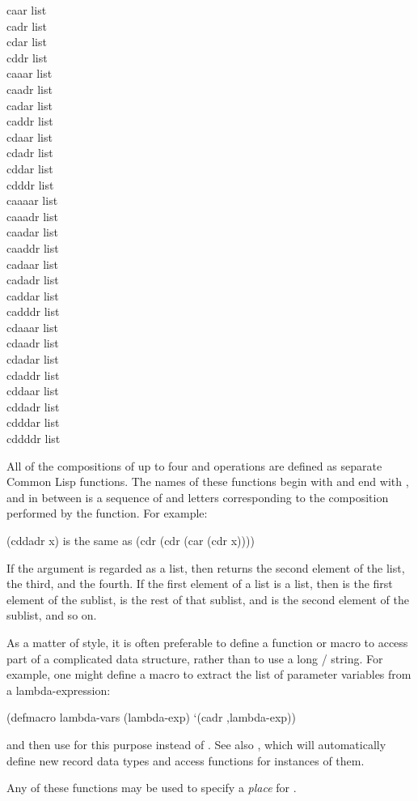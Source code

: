 \begin{defun}[Function]
caar list \\
cadr list \\
cdar list \\
cddr list \\
caaar list \\
caadr list \\
cadar list \\
caddr list \\
cdaar list \\
cdadr list \\
cddar list \\
cdddr list \\
caaaar list \\
caaadr list \\
caadar list \\
caaddr list \\
cadaar list \\
cadadr list \\
caddar list \\
cadddr list \\
cdaaar list \\
cdaadr list \\
cdadar list \\
cdaddr list \\
cddaar list \\
cddadr list \\
cdddar list \\
cddddr list

All of the compositions of up to four  and  operations
are defined as separate Common Lisp functions.
The names of these functions begin with  and end with ,
and in between is a sequence of  and  letters
corresponding to
the composition performed by the function. 
For example:
\begin{lisp}
(cddadr x) {\rm is the same as} (cdr (cdr (car (cdr x))))
\end{lisp}
If the argument is regarded as a list, then  returns
the second element of the list,  the third, and 
the fourth.  If the first element of a list is a list, then
 is the first element of the sublist,  is the
rest of that sublist, and  is the second element of the sublist,
and so on.

As a matter of style, it is often preferable to define a function or
macro to access part of a complicated data structure, rather than to use
a long / string.  For example, one might define
a macro to extract the list of parameter variables from a lambda-expression:
\begin{lisp}
(defmacro lambda-vars (lambda-exp) `(cadr ,lambda-exp))
\end{lisp}
and then use  for this purpose instead of .
See also , which will automatically define
new record data types and access functions for instances of them.

Any of these functions may be used to specify a {\it place} for .
\end{defun}
	

